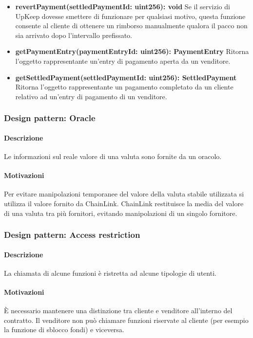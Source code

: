 \documentclass[a4paper, 12pt]{article}
\begin{document}
\begin{itemize}
    \item \textbf{revertPayment(settledPaymentId: uint256): void}
    Se il servizio di UpKeep dovesse smettere di funzionare per qualsiasi motivo, questa funzione consente al cliente di ottenere un rimborso manualmente qualora il pacco non sia arrivato dopo l'intervallo prefissato.\\
    \item \textbf{getPaymentEntry(paymentEntryId: uint256): PaymentEntry}
    Ritorna l'oggetto rappresentante un'entry di pagamento aperta da un venditore.\\
    \item \textbf{getSettledPayment(settledPaymentId: uint256): SettledPayment}
    Ritorna l'oggetto rappresentante un pagamento completato da un cliente relativo ad un'entry di pagamento di un venditore.\\

\end{itemize}
\subsubsection{Design pattern: Oracle}
\paragraph{Descrizione}
Le informazioni sul reale valore di una valuta sono fornite da un oracolo.
\paragraph{Motivazioni}
Per evitare manipolazioni temporanee del valore della valuta stabile utilizzata si utilizza il valore fornito da ChainLink.
ChainLink restituisce la media del valore di una valuta tra più fornitori, evitando manipolazioni di un singolo fornitore.
\subsubsection{Design pattern: Access restriction}
\paragraph{Descrizione}
La chiamata di alcune funzioni è ristretta ad alcune tipologie di utenti.
\paragraph{Motivazioni}
È necessario mantenere una distinzione tra cliente e venditore all'interno del contratto.
Il venditore non può chiamare funzioni riservate al cliente (per esempio la funzione di sblocco fondi) e viceversa.
\end{document}

